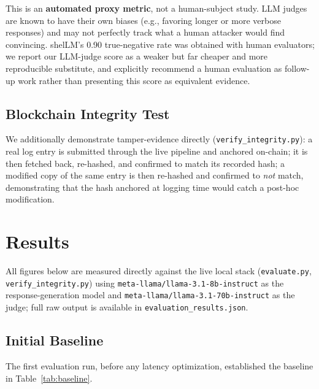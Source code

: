 \documentclass[conference]{IEEEtran}
\begin{document}
This is an \textbf{automated proxy metric}, not a human-subject study. LLM
judges are known to have their own biases (e.g., favoring longer or more
verbose responses) and may not perfectly track what a human attacker would
find convincing. shelLM's 0.90 true-negative rate \cite{sladic2024shellm}
was obtained with human evaluators; we report our LLM-judge score as a
weaker but far cheaper and more reproducible substitute, and explicitly
recommend a human evaluation as follow-up work rather than presenting this
score as equivalent evidence.

\subsection{Blockchain Integrity Test}
\label{sec:blockchaintest}

We additionally demonstrate tamper-evidence directly
(\texttt{verify\_integrity.py}): a real log entry is submitted through the
live pipeline and anchored on-chain; it is then fetched back, re-hashed, and
confirmed to match its recorded hash; a modified copy of the same entry is
then re-hashed and confirmed to \emph{not} match, demonstrating that the
hash anchored at logging time would catch a post-hoc modification.

\section{Results}

All figures below are measured directly against the live local stack
(\texttt{evaluate.py}, \texttt{verify\_integrity.py}) using
\texttt{meta-llama/llama-3.1-8b-instruct} as the response-generation model
and \texttt{meta-llama/llama-3.1-70b-instruct} as the judge; full raw output
is available in \texttt{evaluation\_results.json}.

\subsection{Initial Baseline}
\label{sec:baseline}

The first evaluation run, before any latency optimization, established the
baseline in Table~\ref{tab:baseline}.
\end{document}
